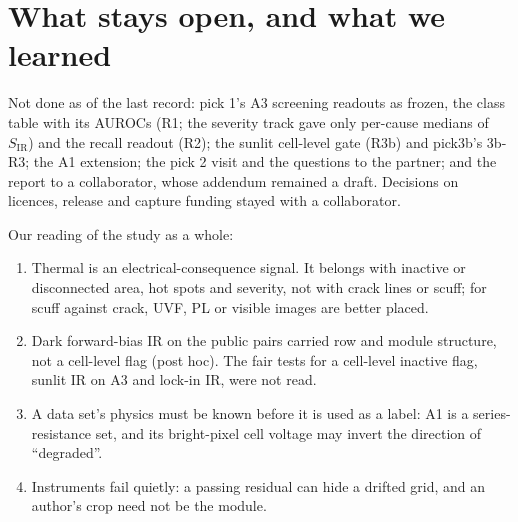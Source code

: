 \section{What stays open, and what we learned}\label{sec:thermal-open}

Not done as of the last record: pick 1's A3 screening readouts as frozen, the class table with its AUROCs (R1; the severity track gave
only per-cause medians of $S_\mathrm{IR}$) and the recall readout (R2); the sunlit cell-level gate (R3b)
and pick3b's 3b-R3; the A1 extension; the pick 2 visit and the questions to the partner; and the report to a collaborator, whose addendum
remained a draft. Decisions on licences, release and capture funding stayed with a collaborator.

Our reading of the study as a whole:
\begin{enumerate}
\item Thermal is an electrical-consequence signal. It belongs with inactive or disconnected area, hot spots and severity, not with crack
lines or scuff; for scuff against crack, UVF, PL or visible images are better placed.
\item Dark forward-bias IR on the public pairs carried row and module structure, not a cell-level flag (post hoc). The fair tests for a
cell-level inactive flag, sunlit IR on A3 and lock-in IR, were not read.
\item A data set's physics must be known before it is used as a label: A1 is a series-resistance set, and its bright-pixel cell voltage
may invert the direction of ``degraded''.
\item Instruments fail quietly: a passing residual can hide a drifted grid, and an author's crop need not be the module.
\end{enumerate}
